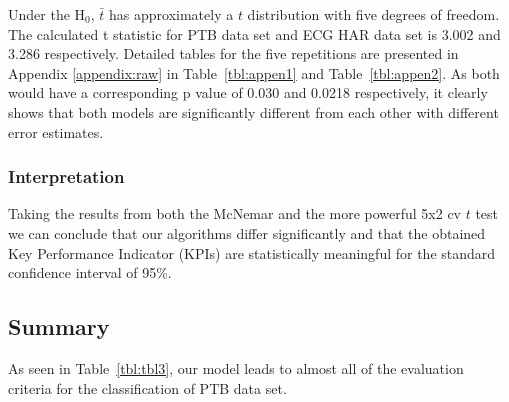 \documentclass{ieeeaccess}
\begin{document}
Under the H$_0$, $\bar{t}$ has approximately a $t$ distribution with five degrees of freedom. 
The calculated t statistic for PTB data set and ECG HAR data set is 3.002 and 3.286 respectively. Detailed tables for the five repetitions are presented in Appendix \ref{appendix:raw} in Table~\ref{tbl:appen1} and Table~\ref{tbl:appen2}. As both would have a corresponding p value of 0.030 and 0.0218 respectively, it clearly shows that both models are significantly different from each other with different error estimates. 
\subsubsection{Interpretation}
Taking the results from both the McNemar and the more powerful 5x2 cv $t$ test we can conclude that our algorithms differ significantly and that the obtained Key Performance Indicator (KPIs) are statistically meaningful for the standard confidence interval of 95\%.

\subsection{Summary}
As seen in Table~\ref{tbl:tbl3}, our model leads to almost all of the evaluation criteria for the classification of PTB data set.
\end{document}
